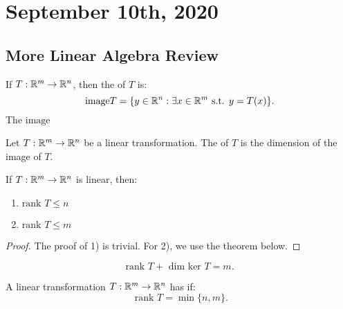 \documentclass[../main/main.tex]{subfiles}
\begin{document}
\section{September 10th, 2020}
\subsection{More Linear Algebra Review}
\begin{definition}
    If $T:  \mathbb{R}^{m}\to  \mathbb{R}^{n}$, then the  of $T$ is:  \[
        \text{image} T = \{y \in  \mathbb{R}^{n} : \exists x \in  \mathbb{R} ^{m} \text{ s.t. } y=T(x)\} 
    .\] 
   The $ \text{image}$ 
\end{definition}
\begin{definition}
    Let $T: \mathbb{R}^{m} \to  \mathbb{R}^{n}$ be a linear transformation. The  of $T$ is the dimension of the image of $T$.
\end{definition}
\begin{lemma}
   If $T: \mathbb{R}^{m}\to  \mathbb{R}^{n}$ is linear, then: 
   \begin{enumerate}
       \item $ \text{rank }T \le n$
       \item $ \text{rank }T \le m$
   \end{enumerate}
\end{lemma}
\begin{proof}
    The proof of 1) is trivial. For 2), we use the theorem below. 
\end{proof}
\begin{theorem}
   \[
   \text{rank }T + \text{ dim ker } T = m
   .\]  
\end{theorem}

\begin{definition}
    A linear transformation $T: \mathbb{R}^{m} \to  \mathbb{R} ^{n}$ has  if: \[
    \text{ rank }T = \min \{n,m\} 
    .\] 
\end{definition}
\end{document}
